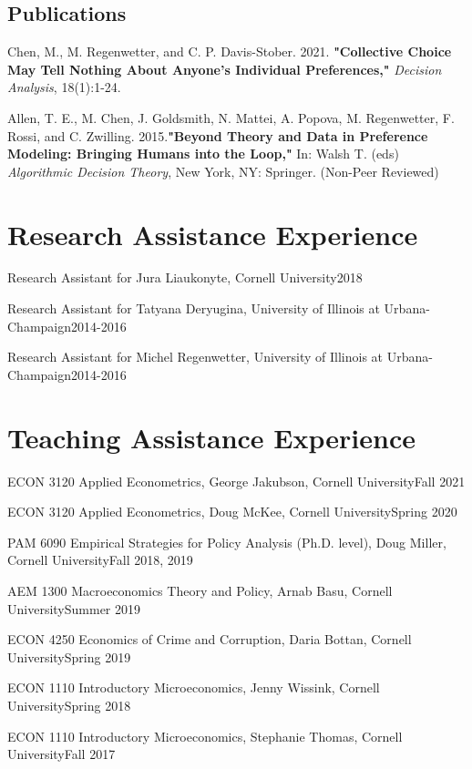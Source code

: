 \documentclass[letterpaper]{article}
\renewenvironment{itemize}{
  \begin{list}{}{
    \setlength{\leftmargin}{0.35em}
  }
}{
  \end{list}
}
\begin{document}
\subsection*{Publications}
\begin{itemize}
\item Chen, M., M. Regenwetter, and C. P. Davis-Stober. 2021. \textbf{"Collective Choice May Tell Nothing About Anyone’s Individual Preferences,"} \textit{Decision Analysis}, 18(1):1-24.
\item Allen, T. E., M. Chen, J. Goldsmith, N. Mattei, A. Popova, M. Regenwetter, F. Rossi, and C. Zwilling. 2015.\textbf{"Beyond Theory and Data in Preference Modeling: Bringing Humans into the Loop,"} In: Walsh T. (eds)  \textit{Algorithmic Decision Theory}, New York, NY: Springer. (Non-Peer Reviewed)
\end{itemize}

\section*{Research Assistance Experience}
\begin{itemize}
\item Research Assistant for Jura Liaukonyte, Cornell University\hfill2018
\item Research Assistant for Tatyana Deryugina, University of Illinois at Urbana-Champaign\hfill 2014-2016
\item Research Assistant for Michel Regenwetter, University of Illinois at Urbana-Champaign\hfill 2014-2016
\end{itemize}
\section*{Teaching Assistance Experience}

\begin{itemize}
\item ECON 3120 Applied Econometrics, George Jakubson, Cornell University\hfill Fall 2021
\item ECON 3120 Applied Econometrics, Doug McKee, Cornell University\hfill Spring 2020
\item PAM 6090 Empirical Strategies for Policy Analysis (Ph.D. level), Doug Miller, Cornell University\hfill Fall 2018, 2019
\item AEM 1300 Macroeconomics Theory and Policy, Arnab Basu, Cornell University\hfill Summer 2019
\item ECON 4250 Economics of Crime and Corruption, Daria Bottan, Cornell University\hfill Spring 2019
\item ECON 1110 Introductory Microeconomics, Jenny Wissink, Cornell University\hfill  Spring 2018
\item ECON 1110 Introductory Microeconomics, Stephanie Thomas, Cornell University\hfill Fall 2017
\end{itemize}
\end{document}
